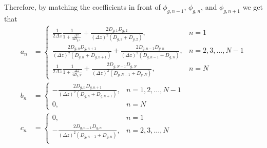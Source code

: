 \documentclass[english, a4paper, 12pt]{article}
\begin{document}
Therefore, by matching the coefficients in front of $\phi_{g,n-1}$, $\phi_{g,n}$, and $\phi_{g,n+1}$ we get that
\begin{align}
    a_n &= \begin{cases}
        \frac{1}{2\Delta z}\frac{1}{1+\frac{\Delta z}{4D_{g,1}}} + \frac{2D_{g,1}D_{g,2}}{(\Delta z)^2(D_{g,1}+ D_{g,2})}, &n=1\\
        \frac{2D_{g,n}D_{g,n+1}}{(\Delta z)^2(D_{g,n}+ D_{g,n+1})} + \frac{2D_{g,n-1}D_{g,n}}{(\Delta z)^2(D_{g,n-1}+ D_{g,n})}, & n=2,3,\dots,N-1\\
        \frac{1}{2\Delta z}\frac{1}{1+\frac{\Delta z}{4D_{g,N}}} + \frac{2D_{g,N-1}D_{g,N}}{(\Delta z)^2(D_{g,N-1}+ D_{g,N})}, &n=N
    \end{cases} \\
    b_n &= \begin{cases}
        -\frac{2D_{g,n}D_{g,n+1}}{(\Delta z)^2 (D_{g,n}+D_{g,n+1})}, &n=1,2,\dots,N-1\\
        0, &n=N
    \end{cases} \\
    c_n &= \begin{cases}
        0, &n=1\\
        -\frac{2D_{g,n-1}D_{g,n}}{(\Delta z)^2 (D_{g,n-1}+D_{g,n})}, &n=2,3,\dots,N\\
    \end{cases}
\end{align}
\end{document}
